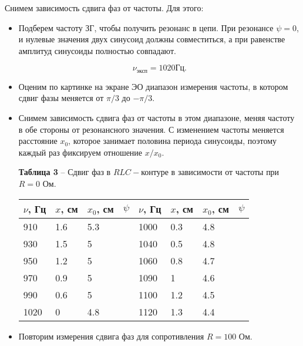 \documentclass[12pt,a4paper]{article}
\begin{document}
        Снимем зависимость сдвига фаз от частоты. Для этого:
        \begin{itemize}
            \item Подберем частоту ЗГ, чтобы получить резонанс в цепи. При резонансе $\psi = 0$, и нулевые значения двух синусоид должны совместиться, а при равенстве амплитуд синусоиды полностью совпадают.
            
            \[
            \nu_{\text{эксп}} = 1020 \text{Гц}.
            \]
            \item Оценим по картинке на экране ЭО диапазон измерения частоты, в котором сдвиг фазы меняется от $\pi/3$ до $-\pi/3$.
            \item Снимем зависимость сдвига фаз от частоты в этом диапазоне, меняя частоту в обе стороны от резонансного значения. С изменением частоты меняется расстояние $x_0$, которое занимает половина периода синусоиды, поэтому каждый раз фиксируем отношение $x/x_0$.
            
            \begin{table}[!h]
            \begin{flushleft}
           		\hspace{20}\textbf{Таблица 3} -- Сдвиг фаз в $RLC-$контуре в зависимости от частоты при $R = 0$ Ом.\\
            \end{flushleft}
                \begin{center}
                    \begin{tabular}{ | l | l | l | l | l | l | l | l |}
                        \hline
                        $\nu$, Гц   &   $x$, см &  $x_0$, см&   $\psi$  &   $\nu$, Гц   &   $x$, см &  $x_0$, см&   $\psi$  \\
                        \hline
                        910         &   1.6     &   5.3     &           &   1000        &   0.3     &   4.8     &      \\
                        930         &   1.5     &   5       &           &   1040        &   0.5     &   4.8     &      \\
                        950         &   1.2     &   5       &           &   1060        &   0.8     &   4.7     &   \\
                        970         &   0.9     &   5       &           &   1090        &   1       &   4.6     &      \\
                        990         &   0.6     &   5       &           &   1100        &   1.2     &   4.5     &    \\
                        1020        &   0       &   4.8     &           &   1120        &   1.3     &   4.4     &    \\
                        \hline         
                    \end{tabular}
                \end{center}
            \end{table}   
            \item Повторим измерения сдвига фаз для сопротивления $R = 100$ Ом.
            

\end{itemize}
\end{document}

